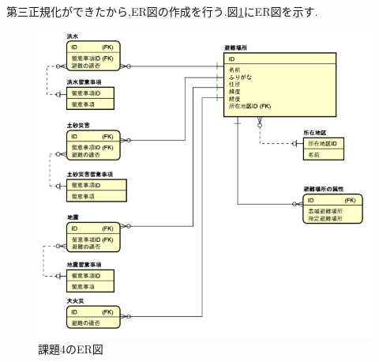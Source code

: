 \documentclass[a4j]{jarticle}
\begin{document}
    第三正規化ができたから,ER図の作成を行う.図\ref{kadai4ER}にER図を示す.
    \begin{figure}[H]
      \centering
      \includegraphics[scale=1.0]{kadai4ER.png}
      \caption{課題4のER図}
       \label{kadai4ER}
      \end{figure}
\end{document}
